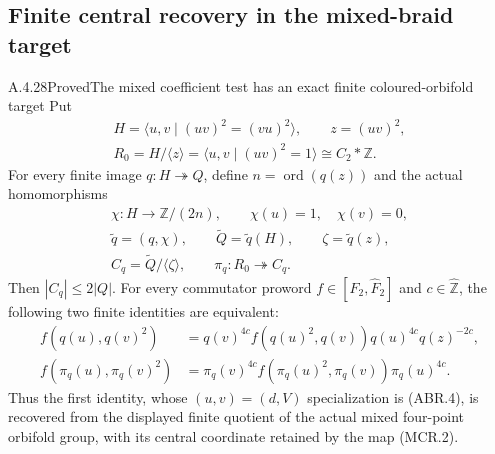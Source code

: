 \subsection{Finite central recovery in the mixed-braid target}

\begin{result}{A.4.28}{Proved}{The mixed coefficient test has an exact finite coloured-orbifold target}
\label{prop:mixed-finite-central-recovery}
Put
\[
\begin{gathered}
 H=\langle u,v\mid(uv)^2=(vu)^2\rangle,
 \qquad z=(uv)^2,\\
 R_0=H/\langle z\rangle
       =\langle u,v\mid(uv)^2=1\rangle\cong C_2*\mathbb Z.
\end{gathered}                                                  \tag{MCR.1}
\]
For every finite image $q:H\twoheadrightarrow Q$, define
$n=\operatorname{ord}(q(z))$ and the actual homomorphisms
\[
\begin{gathered}
 \chi:H\longrightarrow\mathbb Z/(2n),\qquad
       \chi(u)=1,\quad\chi(v)=0,\\
 \widetilde q=(q,\chi),\qquad
 \widetilde Q=\widetilde q(H),\qquad
 \zeta=\widetilde q(z),\\
 C_q=\widetilde Q/\langle\zeta\rangle,\qquad
 \pi_q:R_0\twoheadrightarrow C_q.
\end{gathered}                                                  \tag{MCR.2}
\]
Then $|C_q|\leq2|Q|$.  For every commutator proword
$f\in[\widehat F_2,\widehat F_2]$ and $c\in\widehat{\mathbb Z}$,
the following two finite identities are equivalent:
\[
\begin{aligned}
 f(q(u),q(v)^2)
   &=q(v)^{4c}f(q(u)^2,q(v))q(u)^{4c}q(z)^{-2c},\\
 f(\pi_q(u),\pi_q(v)^2)
   &=\pi_q(v)^{4c}f(\pi_q(u)^2,\pi_q(v))\pi_q(u)^{4c}.
\end{aligned}                                                   \tag{MCR.3}
\]
Thus the first identity, whose $(u,v)=(d,V)$ specialization is
(ABR.4), is recovered from the displayed finite quotient of the
actual mixed four-point orbifold group, with its central coordinate
retained by the map (MCR.2).


\end{result}
